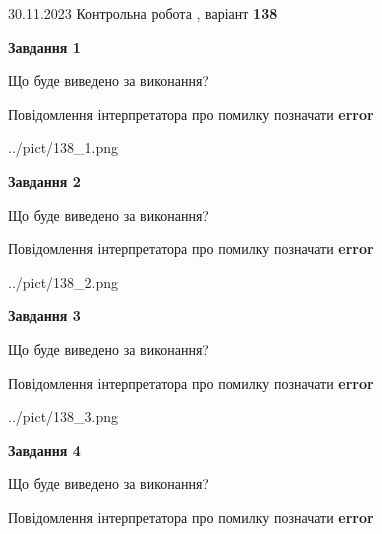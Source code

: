 \documentclass[12pt, ukrainian]{article}
\begin{document}
{{30.11.2023 Контрольна робота , варіант  \No \textbf { 138 }\par}}
{




{\begin {center}\textbf{Завдання 1}\end {center}}\par
Що буде виведено за виконання? \par
Повідомлення інтерпретатора про помилку позначати \textbf{error}

\begin{center}
	{../pict/138_1.png}
\end{center}
\newpage

{\begin {center}\textbf{Завдання 2}\end {center}}\par
Що буде виведено за виконання? \par
Повідомлення інтерпретатора про помилку позначати \textbf{error}

\begin{center}
	{../pict/138_2.png}
\end{center}
\newpage

{\begin {center}\textbf{Завдання 3}\end {center}}\par
Що буде виведено за виконання? \par
Повідомлення інтерпретатора про помилку позначати \textbf{error}

\begin{center}
	{../pict/138_3.png}
\end{center}
\newpage

{\begin {center}\textbf{Завдання 4}\end {center}}\par
Що буде виведено за виконання? \par
Повідомлення інтерпретатора про помилку позначати \textbf{error}

}
\end{document}
